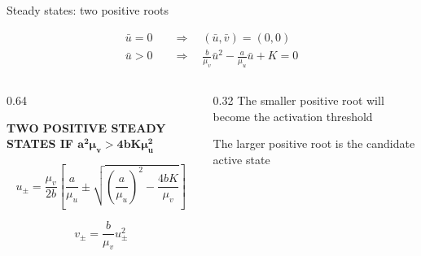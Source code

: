 \begin{frame}{Steady states: two positive roots}

  \vspace{-0.16cm}

  \begin{center}
    {\color{HydraWhite}\fontsize{11.2}{14.2}\selectfont
    \begin{align*}
      \bar u=0
      &\quad\Rightarrow\quad
      (\bar u,\bar v)=(0,0)
      \\
      \bar u>0
      &\quad\Rightarrow\quad
      \frac{b}{\mu_v}\bar u^2
      -
      \frac{a}{\mu_u}\bar u
      +
      K
      =
      0
    \end{align*}
    }
  \end{center}

  \vspace{-0.20cm}

  \begin{columns}[c,onlytextwidth]
    \begin{column}{0.64\textwidth}
      {\color{HydraGold}\bfseries\fontsize{7.7}{9.2}\selectfont
        TWO POSITIVE STEADY STATES IF
        \(\boldsymbol{a^2\mu_v>4bK\mu_u^2}\)\par}

      \vspace{-0.20cm}

      {\color{HydraWhite}\fontsize{10.6}{13.5}\selectfont
      \[
        u_\pm=\frac{\mu_v}{2b}
        \left[
          \frac{a}{\mu_u}
          \pm
          \sqrt{
            \left(\frac{a}{\mu_u}\right)^2
            -\frac{4bK}{\mu_v}
          }
        \right]
      \]
      }

      \vspace{-0.24cm}

      {\color{HydraWhite}\fontsize{10.8}{13.6}\selectfont
      \[
        v_\pm=\frac{b}{\mu_v}u_\pm^2
      \]
      }
    \end{column}

    \begin{column}{0.32\textwidth}
        {The smaller positive root will become the activation threshold}

      \vspace{-0.00cm}

        {The larger positive root is the candidate active state}
    \end{column}
  \end{columns}

  \vspace{-0.12cm}

\end{frame}


